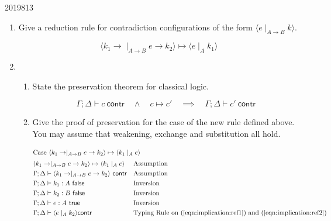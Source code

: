 \documentclass[10pt,\jkfside,a4paper]{article}
\newcommand{\contr}{\ensuremath{\mathsf{contr}}\xspace}
\begin{document}
\begin{enumerate}
\begin{examquestion}{2019}{8}{13}
\begin{enumerate}[label=(\alph*)]
\begin{figure}[H]
            \end{figure}

            \item Give a reduction rule for contradiction configurations of the form $\langle e \mid_{A \to B} k \rangle$.

            \[
                \langle k_1 \to \mid_{A \to B} e \to k_2 \rangle \mapsto \langle e \mid_{A} k_1 \rangle
            \]

            \item

            \begin{enumerate}[label=(\roman*)]

                \item State the preservation theorem for classical logic.

                \[
                    \Gamma; \Delta \vdash c\ \contr \quad \land \quad c \mapsto c' \quad \implies \quad \Gamma; \Delta \vdash c'\ \contr
                \]

                \item Give the proof of preservation for the case of the new rule defined above. You may assume that weakening, exchange and substitution all hold.

                \begin{align}
                \intertext{Case $\langle k_1 \to \mid_{A \to B} e \to k_2 \rangle \mapsto \langle k_1 \mid_{A} e \rangle$}
                & \langle k_1 \to \mid_{A \to B} e \to k_2 \rangle \mapsto \langle k_1 \mid_{A} e \rangle \why{Assumption} \\
                & \Gamma; \Delta \vdash \langle k_1 \to \mid_{A \to B} e \to k_2 \rangle\ \contr \why{Assumption} \\
                & \Gamma; \Delta \vdash k_1: A\ \false \why{Inversion} \label{eqn:implication:ref1}\\
                & \Gamma; \Delta \vdash k_2: B\ \false \why{Inversion} \\
                & \Gamma; \Delta \vdash e: A\ \true \why{Inversion} \label{eqn:implication:ref2}\\
                & \Gamma; \Delta \vdash \langle e \mid_A k_2 \rangle \contr \why{Typing Rule on (\ref{eqn:implication:ref1}) and (\ref{eqn:implication:ref2})}
                \end{align}

            \end{enumerate}


\end{enumerate}
\end{examquestion}
\end{enumerate}
\end{document}
